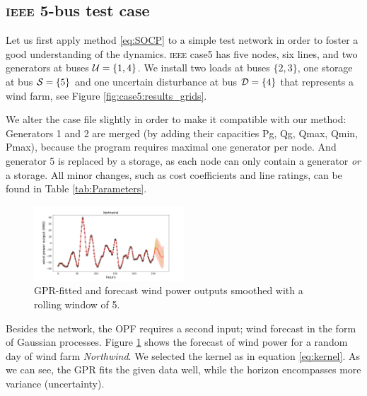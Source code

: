 \documentclass[final,3p,times,twocolumn]{elsarticle}  %
\newcommand{\todo}[1]{\textcolor{orange}{[#1]}}
\begin{document}
\subsection{\textsc{ieee} 5-bus test case}
\label{sec:case5}

Let us first apply method \eqref{eq:SOCP} to a simple test network in order to foster a good understanding of the dynamics. 
\textsc{ieee} case5 has five nodes, six lines, and two generators at buses $\mathcal{\Gen} = \{1,4\}$. We install two loads at buses $\{2,3\}$, one storage at bus $\mathcal{\Storage} = \{5\}$ and one uncertain disturbance at bus $\mathcal{\Load} = \{4\}$ that represents a wind farm, see Figure \ref{fig:case5:results_grids}. 

We alter the case file slightly in order to make it compatible with our method: Generators 1 and 2 are merged (by adding their capacities Pg, Qg, Qmax, Qmin, Pmax), because the program requires maximal one generator per node. 
And generator 5 is replaced by a storage, as each node can only contain a generator \emph{or} a storage. 
All minor changes, such as cost coefficients and line ratings, can be found in Table \ref{tab:Parameters}.

\begin{figure}
    \centering
    \includegraphics[width=0.5\textwidth]{figures/time series/case5_volatile/Wind_power_forecast_noSmoothing.png}
    \caption{GPR-fitted and forecast wind power outputs smoothed with a rolling window of 5.}
    \label{fig:wind_forecast_volatile}
\end{figure}

Besides the network, the OPF requires a second input; wind forecast in the form of Gaussian processes.
Figure \ref{fig:wind_forecast_volatile} shows the forecast of wind power for a random day of wind farm \emph{Northwind}. We selected the kernel as in equation \eqref{eq:kernel}. 
As we can see, the GPR fits the given data well, while the horizon encompasses more variance (uncertainty).
\end{document}
